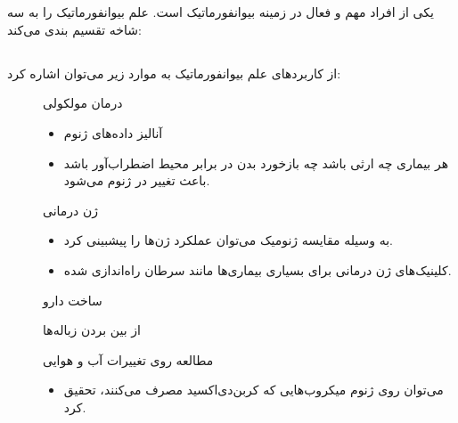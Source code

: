\section{
}

یکی از افراد مهم و فعال در زمینه بیوانفورماتیک
است.
علم بیوانفورماتیک را به سه شاخه تقسیم بندی می‌کند:


\unsetRL
{}
\setRL

\subsection{
}

از کاربرد‌های علم بیوانفورماتیک به موارد زیر ‌می‌توان  اشاره کرد:

\begin{description}

\item[]
	درمان مولکولی
	\begin{itemize}
	\item 
	آنالیز داده‌های ژنوم
	\item
	هر بیماری چه ارثی باشد چه بازخورد بدن در برابر محیط اضطراب‌آور باشد باعث تغییر در ژنوم ‌می‌شود.	
	\end{itemize}	
	
\item[]
	ژن درمانی
	\begin{itemize}
	\item
	به وسیله مقایسه ژنومیک می‌توان عملکرد ژن‌ها را پیشبینی کرد.
	\item
	کلینیک‌های ژن درمانی برای بسیاری بیماری‌ها مانند سرطان راه‌اندازی شده.
	\end{itemize}
	
\item[]
	ساخت دارو
\item[]
	 از بین بردن زباله‌ها
\item[]
	مطالعه روی تغییرات آب و هوایی
	\begin{itemize}
	\item
	می‌توان روی ژنوم میکروب‌هایی که کربن‌دی‌اکسید مصرف می‌کنند، تحقیق کرد.
	\end{itemize}
\end{description}

